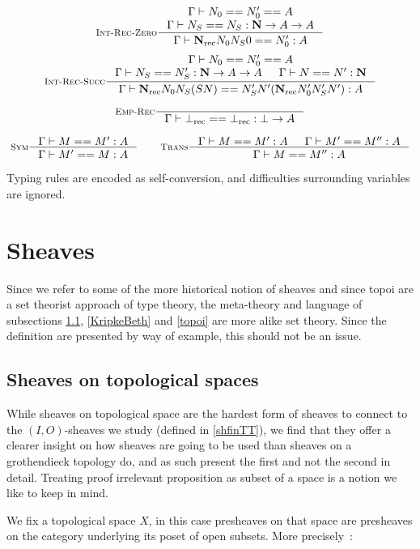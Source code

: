 \documentclass[11pt]{article}
\DeclareMathOperator{\rec}{rec}
\newcommand{\0}{\mathbf{0}}
\newcommand{\1}{\mathbf{1}}
\newcommand{\nat}{\mathbf{N}}
\newcommand{\tctx}{\Gamma}
\begin{document}
$$
    \inference[\textsc{Int-Rec-Zero}]{\tctx |- N_0 == N'_0 == A\\ \tctx |- N_S == N_S : \nat -> A  -> A}{\tctx |- \nat_{\rec} N_0N_S0 == N'_0 : A}
$$
$$
    \inference[\textsc{Int-Rec-Succ}]{\tctx |- N_0 == N'_0 == A\\ \tctx |- N_S == N'_S : \nat -> A  -> A & \tctx |- N == N' :\nat}{\tctx |- \nat_{\rec} N_0N_S (S N) == N'_S N' (\nat_{\rec}N'_0 N'_S N') : A}
$$


$$
    \inference[\textsc{Emp-Rec}]{}{\tctx |- \bot_{\rec} == \bot_{\rec} : \bot -> A}
$$

$$
    \inference[\textsc{Sym}]{\tctx |- M == M' : A}{\tctx |- M' == M : A} \qquad
    \inference[\textsc{Trans}]
    {\tctx |- M == M' :A & \tctx |- M' == M'' : A}{\tctx |- M == M'' : A}
$$

Typing rules are encoded as self-conversion, and difficulties surrounding variables are ignored.

\section{Sheaves}\label{Sheaves}

Since we refer to some of the more historical notion of sheaves and since topoi are a set theorist approach of type theory, the meta-theory and language of subsections \ref{topsheaves}, \ref{KripkeBeth} and  \ref{topoi} are more alike set theory.
Since the definition are presented by way of example, this should not be an issue.

\subsection{Sheaves on topological spaces}\label{topsheaves}

While sheaves on topological space are the hardest form of sheaves to connect to the $(I,O)$-sheaves we study (defined in \ref{shfinTT}), we find that they offer a clearer insight on how sheaves are going to be used than sheaves on a grothendieck topology do, and as such present the first and not the second in detail.
Treating proof irrelevant proposition as subset of a space is a notion we like to keep in mind.

We fix a topological space $X$, in this case presheaves on that space are presheaves on the category underlying its poset of open subsets. More precisely~:
\end{document}
